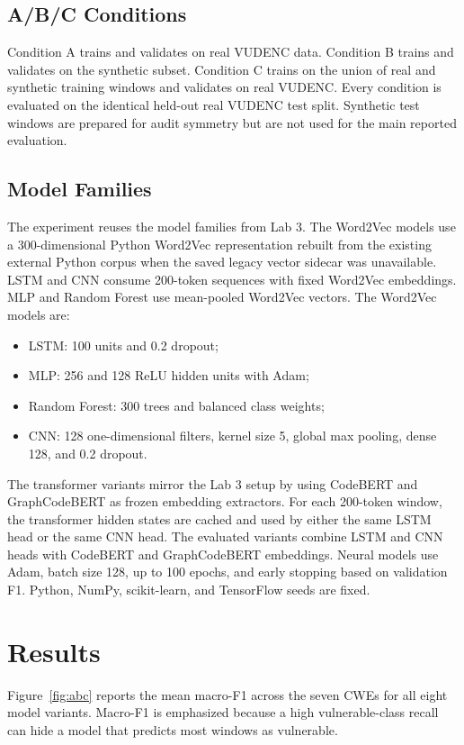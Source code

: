 \subsection{A/B/C Conditions}
Condition A trains and validates on real VUDENC data. Condition B trains and validates on the synthetic subset. Condition C trains on the union of real and synthetic training windows and validates on real VUDENC. Every condition is evaluated on the identical held-out real VUDENC test split. Synthetic test windows are prepared for audit symmetry but are not used for the main reported evaluation.

\subsection{Model Families}
The experiment reuses the model families from Lab 3. The Word2Vec models use a 300-dimensional Python Word2Vec representation rebuilt from the existing external Python corpus when the saved legacy vector sidecar was unavailable. LSTM and CNN consume 200-token sequences with fixed Word2Vec embeddings. MLP and Random Forest use mean-pooled Word2Vec vectors. The Word2Vec models are:
\begin{itemize}
  \item LSTM: 100 units and 0.2 dropout;
  \item MLP: 256 and 128 ReLU hidden units with Adam;
  \item Random Forest: 300 trees and balanced class weights;
  \item CNN: 128 one-dimensional filters, kernel size 5, global max pooling, dense 128, and 0.2 dropout.
\end{itemize}

The transformer variants mirror the Lab 3 setup by using CodeBERT and GraphCodeBERT as frozen embedding extractors. For each 200-token window, the transformer hidden states are cached and used by either the same LSTM head or the same CNN head. The evaluated variants combine LSTM and CNN heads with CodeBERT and GraphCodeBERT embeddings. Neural models use Adam, batch size 128, up to 100 epochs, and early stopping based on validation F1. Python, NumPy, scikit-learn, and TensorFlow seeds are fixed.

\section{Results}
Figure~\ref{fig:abc} reports the mean macro-F1 across the seven CWEs for all eight model variants. Macro-F1 is emphasized because a high vulnerable-class recall can hide a model that predicts most windows as vulnerable.

